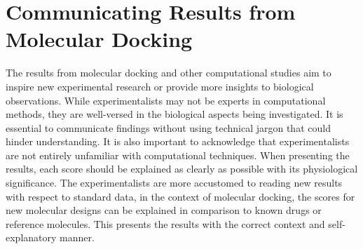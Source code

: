\chapter*{Communicating Results from Molecular Docking}

The results from molecular docking and other computational studies aim to inspire new experimental research or provide more insights to biological observations. While experimentalists may not be experts in computational methods, they are well-versed in the biological aspects being investigated. It is essential to communicate findings without using technical jargon that could hinder understanding. It is also important to acknowledge that experimentalists are not entirely unfamiliar with computational techniques. When presenting the results, each score should be explained as clearly as possible with its physiological significance. The experimentalists are more accustomed to reading new results with respect to standard data, in the context of molecular docking, the scores for new molecular designs can be explained in comparison to known drugs or reference molecules. This presents the results with the correct context and self-explanatory manner. 

